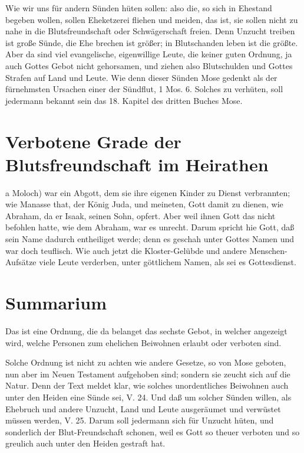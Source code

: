 Wie wir uns für andern Sünden hüten sollen: also die, so sich in Ehestand begeben wollen, sollen Eheketzerei fliehen und meiden, das ist, sie sollen nicht zu nahe in die Blutsfreundschaft oder Schwägerschaft freien. Denn Unzucht treiben ist große Sünde, die Ehe brechen ist größer; in Blutschanden leben ist die größte. Aber da sind viel evangelische, eigenwillige Leute, die keiner guten Ordnung, ja auch Gottes Gebot nicht gehorsamen, und ziehen also Blutschulden und Gottes Strafen auf Land und Leute. Wie denn dieser Sünden Mose gedenkt als der fürnehmsten Ursachen einer der Sündflut, 1 Mos. 6. Solches zu verhüten, soll jedermann bekannt sein das 18. Kapitel des dritten Buches Mose.

\section{Verbotene Grade der Blutsfreundschaft im Heirathen}

a Moloch) war ein Abgott, dem sie ihre eigenen Kinder zu Dienst verbrannten; wie Manasse that, der König Juda, und meineten, Gott damit zu dienen, wie Abraham, da er Isaak, seinen Sohn, opfert. Aber weil ihnen Gott das nicht befohlen hatte, wie dem Abraham, war es unrecht. Darum spricht hie Gott, daß sein Name dadurch entheiliget werde; denn es geschah unter Gottes Namen und war doch teuflisch. Wie auch jetzt die Kloster-Gelübde und andere Menschen-Aufsätze viele Leute verderben, unter göttlichem Namen, als sei es Gottesdienst.

\section{Summarium}

Das ist eine Ordnung, die da belanget das sechste Gebot, in welcher angezeigt wird, welche Personen zum ehelichen Beiwohnen erlaubt oder verboten sind.

Solche Ordnung ist nicht zu achten wie andere Gesetze, so von Mose geboten, nun aber im Neuen Testament aufgehoben sind; sondern sie zeucht sich auf die Natur. Denn der Text meldet klar, wie solches unordentliches Beiwohnen auch unter den Heiden eine Sünde sei, V. 24. Und daß um solcher Sünden willen, als Ehebruch und andere Unzucht, Land und Leute ausgeräumet und verwüstet müssen werden, V. 25. Darum soll jedermann sich für Unzucht hüten, und sonderlich der Blut-Freundschaft schonen, weil es Gott so theuer verboten und so greulich auch unter den Heiden gestraft hat.


